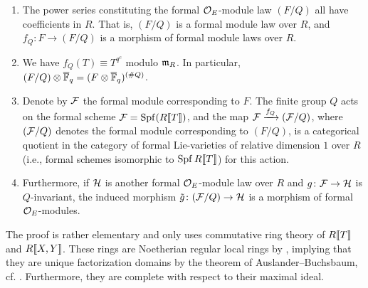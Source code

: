 \documentclass[../main.tex]{subfiles}
\begin{document}
\begin{thm}\label{thm:Quotients}\leavevmode
  \begin{enumerate}
    \item The power series constituting the formal $\mathcal{O}_E$-module law $(F/Q)$
      all have coefficients in $R$. That is, $(F/Q)$ is a formal module law over
      $R$, and $f_Q\colon F \to (F/Q)$ is a morphism of formal module laws over $R$. 
    \item We have $f_Q(T) \equiv T^{q^c}$ modulo $\mathfrak{m}_R$. In particular,
      $(F/Q)\otimes {\overline{\mathbb{F}}_q} = (F \otimes {\overline{\mathbb{F}}_q})^{(\# Q)}$. 
    \item Denote by $\mathcal{F}$ the formal module corresponding to $F$. The finite group
      $Q$ acts on the formal scheme $\mathcal{F} = \operatorname{Spf}(R\llbracket T \rrbracket)$, and the 
      map $\mathcal{F} \xrightarrow{f_Q} (\mathcal{F}/Q)$, where $(\mathcal{F}/Q)$ denotes the formal module
      corresponding to $(F/Q)$, is a categorical quotient 
      in the category of formal Lie-varieties of relative dimension $1$ over $R$  
      (i.e., formal schemes isomorphic to $\operatorname{Spf} R\llbracket T \rrbracket$) for this
      action. 
    \item Furthermore, if $\mathcal{H}$ is another formal $\mathcal{O}_E$-module law over $R$ and
      $g\colon \mathcal{F} \to \mathcal{H}$ is $Q$-invariant, the induced morphism
      $\tilde g \colon (\mathcal{F}/Q) \to \mathcal{H}$ is a morphism of formal $\mathcal{O}_E$-modules.
  \end{enumerate}
\end{thm}
The proof is rather elementary and only uses commutative ring theory of 
$R\llbracket T \rrbracket$ and $R\llbracket X,Y \rrbracket$. These rings are Noetherian regular
local rings by \cite[Proposition 19.5]{matsumura1989commutative}, implying 
that they are unique factorization domains by the theorem of
Auslander--Buchsbaum, cf.
\cite[\href{https://stacks.math.columbia.edu/tag/0AG0}{Tag
0AG0}]{stacks-project}. Furthermore, they are complete with respect to their
maximal ideal.
\end{document}
